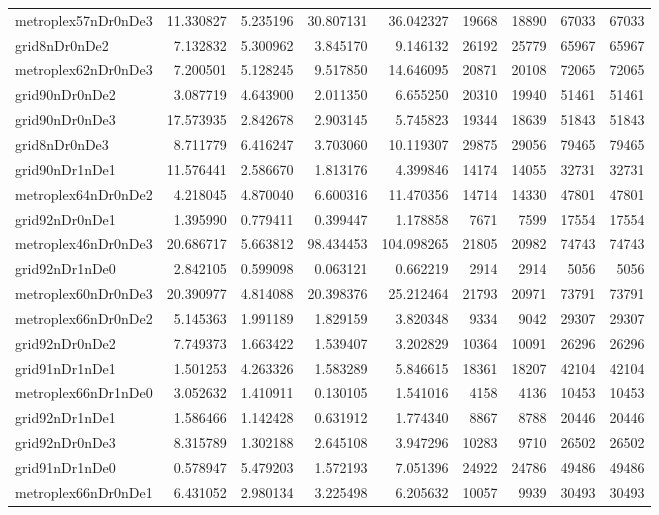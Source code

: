\begin{longtable}{|l|r|r|r|r|r|r|r|r|}
metroplex57nDr0nDe3 & 11.330827 & 5.235196 & 30.807131 & 36.042327 & 19668 & 18890 & 67033 & 67033 \\
grid8nDr0nDe2 & 7.132832 & 5.300962 & 3.845170 & 9.146132 & 26192 & 25779 & 65967 & 65967 \\
metroplex62nDr0nDe3 & 7.200501 & 5.128245 & 9.517850 & 14.646095 & 20871 & 20108 & 72065 & 72065 \\
grid90nDr0nDe2 & 3.087719 & 4.643900 & 2.011350 & 6.655250 & 20310 & 19940 & 51461 & 51461 \\
grid90nDr0nDe3 & 17.573935 & 2.842678 & 2.903145 & 5.745823 & 19344 & 18639 & 51843 & 51843 \\
grid8nDr0nDe3 & 8.711779 & 6.416247 & 3.703060 & 10.119307 & 29875 & 29056 & 79465 & 79465 \\
grid90nDr1nDe1 & 11.576441 & 2.586670 & 1.813176 & 4.399846 & 14174 & 14055 & 32731 & 32731 \\
metroplex64nDr0nDe2 & 4.218045 & 4.870040 & 6.600316 & 11.470356 & 14714 & 14330 & 47801 & 47801 \\
grid92nDr0nDe1 & 1.395990 & 0.779411 & 0.399447 & 1.178858 & 7671 & 7599 & 17554 & 17554 \\
metroplex46nDr0nDe3 & 20.686717 & 5.663812 & 98.434453 & 104.098265 & 21805 & 20982 & 74743 & 74743 \\
grid92nDr1nDe0 & 2.842105 & 0.599098 & 0.063121 & 0.662219 & 2914 & 2914 & 5056 & 5056 \\
metroplex60nDr0nDe3 & 20.390977 & 4.814088 & 20.398376 & 25.212464 & 21793 & 20971 & 73791 & 73791 \\
metroplex66nDr0nDe2 & 5.145363 & 1.991189 & 1.829159 & 3.820348 & 9334 & 9042 & 29307 & 29307 \\
grid92nDr0nDe2 & 7.749373 & 1.663422 & 1.539407 & 3.202829 & 10364 & 10091 & 26296 & 26296 \\
grid91nDr1nDe1 & 1.501253 & 4.263326 & 1.583289 & 5.846615 & 18361 & 18207 & 42104 & 42104 \\
metroplex66nDr1nDe0 & 3.052632 & 1.410911 & 0.130105 & 1.541016 & 4158 & 4136 & 10453 & 10453 \\
grid92nDr1nDe1 & 1.586466 & 1.142428 & 0.631912 & 1.774340 & 8867 & 8788 & 20446 & 20446 \\
grid92nDr0nDe3 & 8.315789 & 1.302188 & 2.645108 & 3.947296 & 10283 & 9710 & 26502 & 26502 \\
grid91nDr1nDe0 & 0.578947 & 5.479203 & 1.572193 & 7.051396 & 24922 & 24786 & 49486 & 49486 \\
metroplex66nDr0nDe1 & 6.431052 & 2.980134 & 3.225498 & 6.205632 & 10057 & 9939 & 30493 & 30493 \\

\end{longtable}
